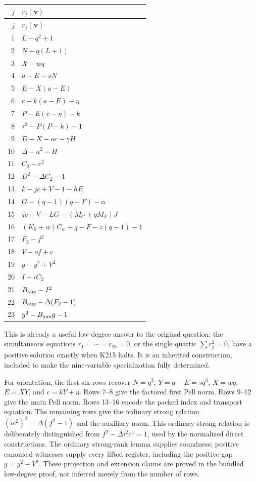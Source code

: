 \documentclass[11pt,a4paper]{article}
\theoremstyle{remark}
\begin{document}
\begin{longtable}{@{}r@{\quad}l@{}}
\toprule
$j$ & $r_j(\mathbf v)$\\\midrule
\endfirsthead
\toprule $j$ & $r_j(\mathbf v)$\\\midrule
\endhead
1 & $L-q^2+1$\\
2 & $N-q(L+1)$\\
3 & $X-wq$\\
4 & $a-E-sN$\\
5 & $E-X(a-E)$\\
6 & $c-k(a-E)-\eta$\\
7 & $P-E(c-\eta)-k$\\
8 & $\tau^2-P(P-k)-1$\\
9 & $D-X-ac-\gamma H$\\
10 & $\Delta-a^2-H$\\
11 & $C_2-c^2$\\
12 & $D^2-\Delta C_2-1$\\
13 & $k-jc+V-1-hE$\\
14 & $G-(q-1)(q-F)-\alpha$\\
15 & $jc-V-LG-(M_C+qM_F)J$\\
16 & $(K_0+w)C_w+q-F-z(q-1)-1$\\
17 & $F_2-f^2$\\
18 & $V-of+c$\\
19 & $g-y^2+V^2$\\
20 & $I-iC_2$\\
21 & $B_{\rm aux}-I^2$\\
22 & $B_{\rm aux}-\Delta(F_2-1)$\\
23 & $y^2-B_{\rm aux}g-1$\\
\bottomrule
\end{longtable}

This is already a useful low-degree answer to the original question:
the simultaneous equations $r_1=\cdots=r_{23}=0$, or the single quartic
$\sum r_j^2=0$, have a positive solution exactly when K215 halts.
It is an inherited construction, included to make the nine-variable
specialization fully determined.

For orientation, the first six rows recover
$N=q^3$, $Y=a-E=sq^3$, $X=wq$, $E=XY$, and $c=kY+\eta$.
Rows 7--8 give the factored first Pell norm.  Rows 9--12 give the main
Pell norm.  Rows 13--16 encode the packed index and transport equation.
The remaining rows give the ordinary strong relation
$(ic^2)^2=\Delta(f^2-1)$ and the auxiliary norm.
This ordinary strong relation is deliberately distinguished from
$f^2-\Delta i^2c^4=1$, used by the normalized direct constructions.
The ordinary strong-rank lemma supplies soundness; positive canonical
witnesses supply every lifted register, including the positive gap
$g=y^2-V^2$.  These projection and extension claims are proved in the
bundled low-degree proof, not inferred merely from the number of rows.
\end{document}
